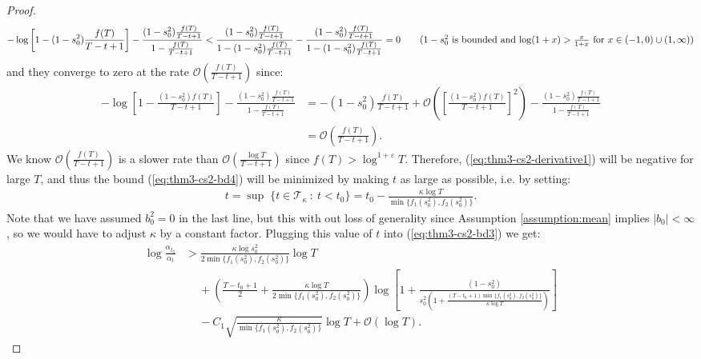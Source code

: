 \begin{proof}
\small
\begin{align*}
    - \log\left[1 - (1 - s_0^2)\frac{f(T)}{T-t+1}\right] - \frac{(1 - s_0^2)\frac{f(T)}{T-t+1}}{1 - \frac{f(T)}{T - t + 1}} < \frac{ (1 - s_0^2)\frac{f(T)}{T-t+1}}{1 - (1 - s_0^2)\frac{f(T)}{T-t+1}}- \frac{(1 - s_0^2)\frac{f(T)}{T-t+1}}{1 - (1-s_0^2)\frac{f(T)}{T - t + 1}} = 0 \tag{$1 - s_0^2$ is bounded and $\log(1 + x) > \frac{x}{1+x}$ for $x \in (-1,0)\cup(1,\infty)$}
\end{align*}
\normalsize
and they converge to zero at the rate $\mathcal{O}\left(\frac{f(T)}{T-t+1}\right)$ since:
\small
\begin{align*}
    - \log\left[1 -\frac{ (1 - s_0^2)f(T)}{T-t+1}\right] - \frac{(1 - s_0^2)\frac{f(T)}{T-t+1}}{1 - \frac{f(T)}{T - t + 1}} &= -(1 - s_0^2)\frac{f(T)}{T-t+1} + \mathcal{O}\left(\left[\frac{(1 - s_0^2)f(T)}{T-t+1}\right]^2\right) - \frac{(1 - s_0^2)\frac{f(T)}{T-t+1}}{1 - \frac{f(T)}{T - t + 1}} \\
    &= \mathcal{O}\left(\frac{f(T)}{T-t+1}\right).
\end{align*}
\normalsize
We know $\mathcal{O}\left(\frac{f(T)}{T-t+1}\right)$ is a slower rate than $\mathcal{O}\left(\frac{\log T}{T-t+1}\right)$ since $f(T) > \log^{1+\varepsilon} T$. Therefore, (\ref{eq:thm3-cs2-derivative1}) will be negative for large $T$, and thus the bound (\ref{eq:thm3-cs2-bd4}) will be minimized by making $t$ as large as possible, i.e. by setting: 
\begin{align*}
    t = \sup\;\{t \in \mathcal{T}_{\kappa} \::\: t< t_0\} = t_0 - \frac{\kappa \log T}{\min\{f_1(s_0^2), f_2(s_0^2)\}}. 
\end{align*}
Note that we have assumed $b_0^2 = 0$ in the last line, but this with out loss of generality since Assumption \ref{assumption:mean} implies $|b_0| < \infty$, so we would have to adjust $\kappa$ by a constant factor. Plugging this value of $t$ into (\ref{eq:thm3-cs2-bd3}) we get:
\begin{align*}
    \log \frac{\alpha_{t_0}}{\alpha_t} &> \frac{\kappa \log s_0^2 }{2\min\{f_1(s_0^2), f_2(s_0^2)\}}\log T \\
    &\quad\: + \left(\frac{T - t_0 +1}{2} + \frac{\kappa \log T}{2\min\{f_1(s_0^2), f_2(s_0^2)\}}\right)\log\left[1 + \frac{(1 - s_0^2)}{s_0^{2}\left(1+ \frac{(T-t_0+1)\min\{f_1(s_0^2), f_2(s_0^2)\}}{\kappa \log T}\right)}\right]  \\
    &\quad\: -C_1\sqrt{\frac{\kappa}{\min\{f_1(s_0^2), f_2(s_0^2)\}}} \log T  + \mathcal{O}(\log T).
\end{align*}

\end{proof}
